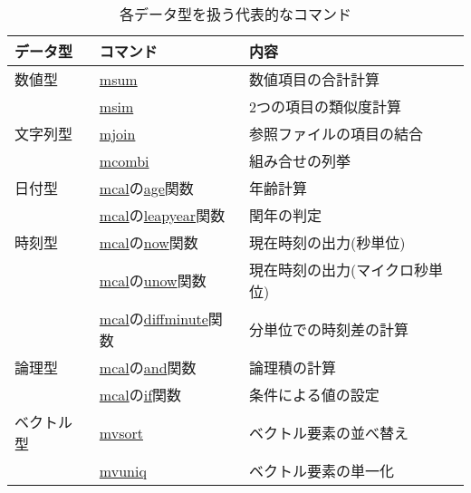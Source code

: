 \begin{table}[!hb]
\begin{center}
\caption{各データ型を扱う代表的なコマンド\label{tbl:datatype_commands}}
{\small
  \begin{tabular}{l|l|l} \hline
データ型  & コマンド               & 内容 \\ \hline
数値型    & \hyperref[sect:msum]{msum} & 数値項目の合計計算 \\
          & \hyperref[sect:msim]{msim} & 2つの項目の類似度計算 \\
\hline
文字列型  & \hyperref[sect:mjoin]{mjoin} & 参照ファイルの項目の結合 \\
          & \hyperref[sect:mcombi]{mcombi} & 組み合せの列挙 \\
\hline
日付型    & \hyperref[sect:mcal]{mcal}の\hyperref[sect:age]{age}関数 & 年齢計算 \\
          & \hyperref[sect:mcal]{mcal}の\hyperref[sect:leapyear]{leapyear}関数 & 閏年の判定 \\
\hline
時刻型    & \hyperref[sect:mcal]{mcal}の\hyperref[sect:now]{now}関数 & 現在時刻の出力(秒単位) \\
          & \hyperref[sect:mcal]{mcal}の\hyperref[sect:unow]{unow}関数 & 現在時刻の出力(マイクロ秒単位) \\
          & \hyperref[sect:mcal]{mcal}の\hyperref[sect:diff]{diffminute}関数 & 分単位での時刻差の計算 \\
\hline
論理型    & \hyperref[sect:mcal]{mcal}の\hyperref[sect:and]{and}関数 & 論理積の計算 \\
          & \hyperref[sect:mcal]{mcal}の\hyperref[sect:if]{if}関数  & 条件による値の設定 \\
\hline
ベクトル型& \hyperref[sect:mvsort]{mvsort}    & ベクトル要素の並べ替え \\
          & \hyperref[sect:mvuniq]{mvuniq}    & ベクトル要素の単一化 \\
\hline
  \end{tabular}
  }
  \end{center}
\end{table}

